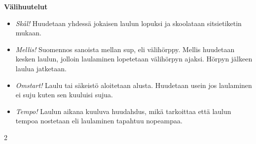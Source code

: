 \documentclass[12pt]{article} %
\begin{document}
\begin{center}
\textbf{Välihuutelut}
\vspace{0.3cm}
\begin{itemize}
    \item \textit{Skål!} Huudetaan yhdessä jokaisen laulun lopuksi ja skoolataan sitsietiketin mukaan.
    \item \textit{Mellis!} Suomennos sanoista mellan sup, eli välihörppy. Mellis huudetaan kesken laulun, jolloin laulaminen lopetetaan välihörpyn ajaksi. Hörpyn jälkeen laulua jatketaan.
    \item \textit{Omstart!} Laulu tai säkeistö aloitetaan alusta. Huudetaan usein jos laulaminen ei suju kuten sen kuuluisi sujua.
    \item \textit{Tempo!} Laulun aikana kuuluva huudahdus, mikä tarkoittaa että laulun tempoa nostetaan eli laulaminen tapahtuu nopeampaa.
\end{itemize}
\end{center}


\clearpage


\begin{multicols}{2}

\tableofcontents

\end{multicols}


\clearpage


%           
%
\end{document}
